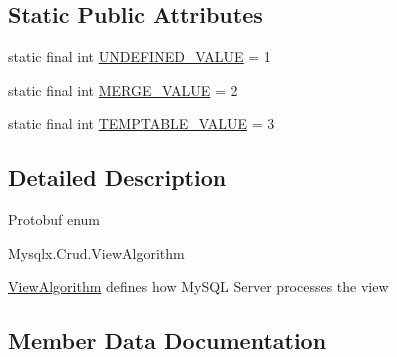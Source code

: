 \subsection*{Static Public Attributes}
\begin{DoxyCompactItemize}
\item 
static final int \mbox{\hyperlink{enumcom_1_1mysql_1_1cj_1_1x_1_1protobuf_1_1_mysqlx_crud_1_1_view_algorithm_ae9e60d6bb88e5019b546bd50fc6d0c42}{U\+N\+D\+E\+F\+I\+N\+E\+D\+\_\+\+V\+A\+L\+UE}} = 1
\item 
static final int \mbox{\hyperlink{enumcom_1_1mysql_1_1cj_1_1x_1_1protobuf_1_1_mysqlx_crud_1_1_view_algorithm_a469266dcd286b0b669be166e8557dc7d}{M\+E\+R\+G\+E\+\_\+\+V\+A\+L\+UE}} = 2
\item 
static final int \mbox{\hyperlink{enumcom_1_1mysql_1_1cj_1_1x_1_1protobuf_1_1_mysqlx_crud_1_1_view_algorithm_a3193f985b14e58d9944fd3338a5bc991}{T\+E\+M\+P\+T\+A\+B\+L\+E\+\_\+\+V\+A\+L\+UE}} = 3
\end{DoxyCompactItemize}


\subsection{Detailed Description}
Protobuf enum
\begin{DoxyCode}
Mysqlx.Crud.ViewAlgorithm 
\end{DoxyCode}



\begin{DoxyPre}
\mbox{\hyperlink{enumcom_1_1mysql_1_1cj_1_1x_1_1protobuf_1_1_mysqlx_crud_1_1_view_algorithm}{ViewAlgorithm}} defines how MySQL Server processes the view
\end{DoxyPre}
 

\subsection{Member Data Documentation}
\mbox{\label{enumcom_1_1mysql_1_1cj_1_1x_1_1protobuf_1_1_mysqlx_crud_1_1_view_algorithm_a907c96cff62b15728e6a78d9493e5bdb}} 

